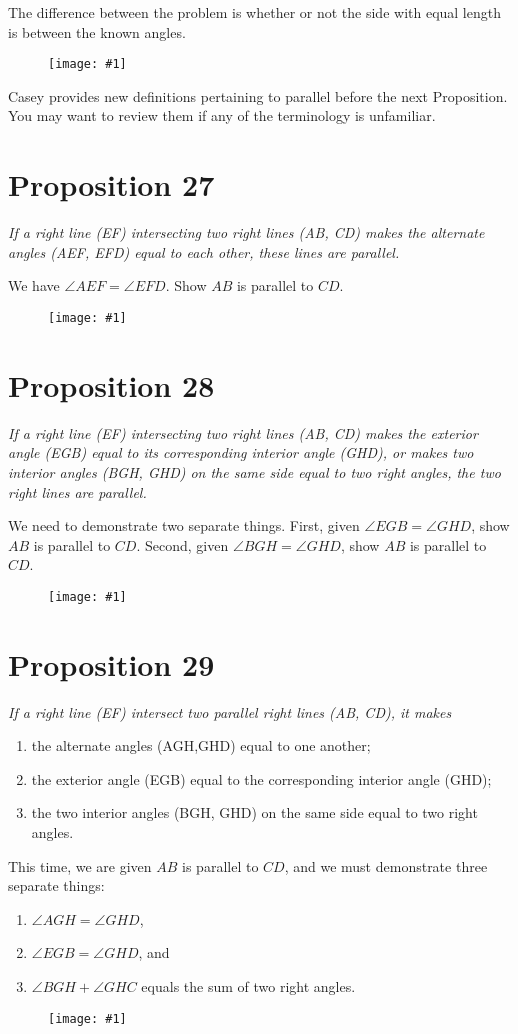 \documentclass[openany]{book}
\newcommand{\diagram}[1]{
    \vspace*{\fill}
    \begin{figure}[H]
        \centering
        \texttt{[image: \#1]}
    \end{figure}
    \vspace*{\fill}
}
\newenvironment{proposition}
    {\begin{center}\em}
    {\end{center}}
\begin{document}
    The difference between the problem is whether or not the side with equal length is between the known angles.
    \diagram{prop26.pdf}

    \clearpage
Casey provides new definitions pertaining to parallel before the next Proposition. You may want to review them if any of the terminology is unfamiliar.
    \section{Proposition 27}
    \begin{proposition}
    If a right line (EF) intersecting two right lines (AB, CD) makes the alternate angles (AEF, EFD) equal to each other, these lines are parallel.
    \end{proposition}

    We have $\angle{AEF} = \angle{EFD}$. Show $AB$ is parallel to $CD$.
    \diagram{prop27.pdf}

    \clearpage
    \section{Proposition 28}
    \begin{proposition}
    If a right line (EF) intersecting two right lines (AB, CD) makes the exterior angle (EGB) equal to its corresponding interior angle (GHD), or makes two interior angles (BGH, GHD) on the same side equal to two right  angles, the two right lines are parallel.
    \end{proposition}
    We need to demonstrate two separate things. First, given $\angle{EGB} = \angle{GHD}$, show $AB$ is parallel to $CD$. Second, given $\angle{BGH} = \angle{GHD}$, show $AB$ is parallel to $CD$.
    \diagram{prop28.pdf}


    \clearpage
    \section{Proposition 29}
    \begin{proposition}
    If a right line (EF) intersect two parallel right lines (AB, CD), it makes
    \begin{enumerate}
        \item the alternate angles (AGH,GHD) equal
    to one another;
        \item the exterior angle (EGB) equal to the corresponding interior angle (GHD);
        \item the two interior angles (BGH, GHD) on the same side equal to two right angles.
    \end{enumerate}
    \end{proposition}
    This time, we are given $AB$ is parallel to $CD$, and we must demonstrate three separate things:
    \begin{enumerate}
        \item $\angle{AGH} = \angle{GHD}$,
        \item $\angle{EGB} = \angle{GHD}$, and
        \item $\angle{BGH} + \angle{GHC}$ equals the sum of two right angles.
    \end{enumerate}
    \diagram{prop29.pdf}
\end{document}
